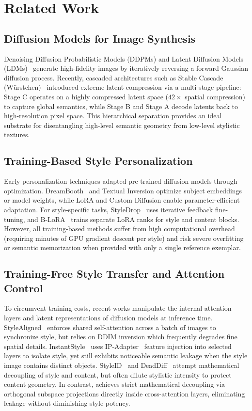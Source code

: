 \section{Related Work}
\label{sec:related}

\subsection{Diffusion Models for Image Synthesis}
Denoising Diffusion Probabilistic Models (DDPMs) and Latent Diffusion Models (LDMs)~\cite{rombach2022highresolution} generate high-fidelity images by iteratively reversing a forward Gaussian diffusion process. Recently, cascaded architectures such as Stable Cascade (W{\"u}rstchen)~\cite{pernias2023stablecascade} introduced extreme latent compression via a multi-stage pipeline: Stage C operates on a highly compressed latent space ($42\times$ spatial compression) to capture global semantics, while Stage B and Stage A decode latents back to high-resolution pixel space. This hierarchical separation provides an ideal substrate for disentangling high-level semantic geometry from low-level stylistic textures.

\subsection{Training-Based Style Personalization}
Early personalization techniques adapted pre-trained diffusion models through optimization. DreamBooth~\cite{ruiz2023dreambooth} and Textual Inversion optimize subject embeddings or model weights, while LoRA and Custom Diffusion enable parameter-efficient adaptation. For style-specific tasks, StyleDrop~\cite{sohn2023styledrop} uses iterative feedback fine-tuning, and B-LoRA~\cite{chung2024blora} trains separate LoRA ranks for style and content blocks. However, all training-based methods suffer from high computational overhead (requiring minutes of GPU gradient descent per style) and risk severe overfitting or semantic memorization when provided with only a single reference exemplar.

\subsection{Training-Free Style Transfer and Attention Control}
To circumvent training costs, recent works manipulate the internal attention layers and latent representations of diffusion models at inference time. StyleAligned~\cite{hertz2023stylealigned} enforces shared self-attention across a batch of images to synchronize style, but relies on DDIM inversion which frequently degrades fine spatial details. InstantStyle~\cite{wang2024instantstyle} uses IP-Adapter~\cite{ye2023ipadapter} feature injection into selected layers to isolate style, yet still exhibits noticeable semantic leakage when the style image contains distinct objects. StyleID~\cite{dinh2024styleid} and DeadDiff~\cite{qi2024deaddiff} attempt mathematical decoupling of style and content, but often dilute stylistic intensity to protect content geometry. In contrast, \method achieves strict mathematical decoupling via orthogonal subspace projections directly inside cross-attention layers, eliminating leakage without diminishing style potency.

